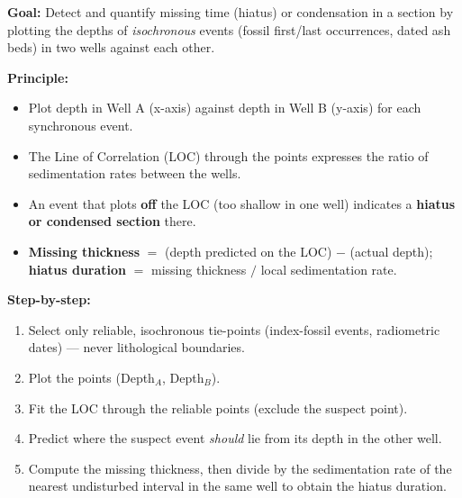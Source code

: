 \documentclass[11pt]{article}
\newcommand{\cle}[1]{{\popxbold\color{popdark}#1}}
\begin{document}
\begin{methode}
\textbf{Goal:} Detect and quantify missing time (hiatus) or condensation in a section by plotting the depths of \emph{isochronous} events (fossil first/last occurrences, dated ash beds) in two wells against each other.

\textbf{Principle:}
\begin{itemize}
    \item Plot depth in Well A (x-axis) against depth in Well B (y-axis) for each synchronous event.
    \item The \cle{Line of Correlation (LOC)} through the points expresses the ratio of sedimentation rates between the wells.
    \item An event that plots \textbf{off} the LOC (too shallow in one well) indicates a \textbf{hiatus or condensed section} there.
    \item \textbf{Missing thickness} $=$ (depth predicted on the LOC) $-$ (actual depth); \textbf{hiatus duration} $=$ missing thickness $/$ local sedimentation rate.
\end{itemize}

\textbf{Step-by-step:}
\begin{enumerate}
    \item Select only reliable, isochronous tie-points (index-fossil events, radiometric dates) --- never lithological boundaries.
    \item Plot the points (Depth$_A$, Depth$_B$).
    \item Fit the LOC through the reliable points (exclude the suspect point).
    \item Predict where the suspect event \emph{should} lie from its depth in the other well.
    \item Compute the missing thickness, then divide by the sedimentation rate of the nearest undisturbed interval in the same well to obtain the hiatus duration.
\end{enumerate}
\end{methode}
\end{document}
